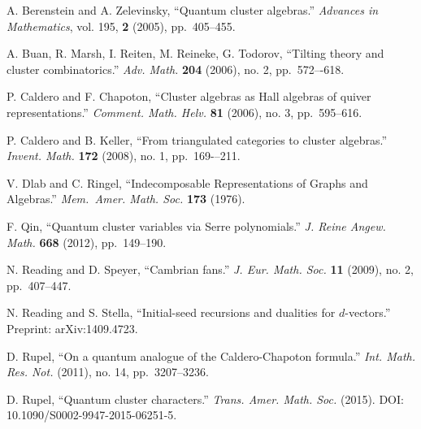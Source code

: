 \documentclass{amsart}
\begin{document}
\begin{thebibliography}{99}

A. Berenstein and A. Zelevinsky, ``Quantum cluster algebras.''   {\em Advances in Mathematics}, vol. 195, {\bf 2} (2005), pp.~405--455.

 A. Buan, R. Marsh, I. Reiten, M. Reineke, G. Todorov, ``Tilting theory and cluster combinatorics.'' {\em Adv. Math.} \textbf{204} (2006), no. 2, pp.~572–-618.

 P. Caldero and F. Chapoton, ``Cluster algebras as Hall algebras of quiver representations.'' {\em Comment. Math. Helv.} \textbf{81} (2006), no. 3, pp.~595--616.

 P. Caldero and B. Keller, ``From triangulated categories to cluster algebras.''  {\em Invent. Math.} \textbf{172} (2008), no. 1, pp.~169-–211.

 V. Dlab and C. Ringel, ``Indecomposable Representations of Graphs and Algebras.'' {\em Mem.~Amer. Math. Soc.} \textbf{173} (1976).

 F. Qin, ``Quantum cluster variables via Serre polynomials.''  {\em J. Reine Angew. Math.} \textbf{668} (2012), pp.~149--190.

 N. Reading and D. Speyer, ``Cambrian fans.'' {\em J. Eur. Math. Soc.} \textbf{11} (2009), no. 2, pp.~407--447.

 N. Reading and S. Stella, ``Initial-seed recursions and dualities for $d$-vectors.'' Preprint: arXiv:1409.4723.
   
 D. Rupel, ``On a quantum analogue of the Caldero-Chapoton formula.'' {\em Int. Math. Res. Not.} (2011), no. 14, pp.~3207--3236.

 D. Rupel, ``Quantum cluster characters.'' {\em Trans. Amer. Math. Soc.} (2015). DOI: 10.1090/S0002-9947-2015-06251-5.

\end{thebibliography}
\end{document}
